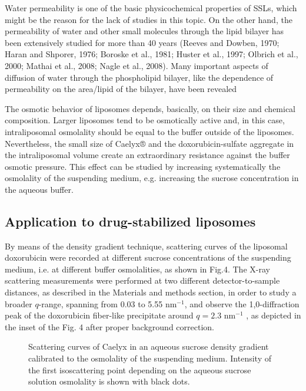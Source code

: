 Water permeability is one of the basic physicochemical properties of SSLs, which might be the reason for the lack of studies in this topic. On the other hand, the permeability of water and other small molecules through the lipid bilayer has been extensively studied for more than 40 years (Reeves and Dowben, 1970; Haran and Shporer, 1976; Boroske et al., 1981; Huster et al., 1997; Olbrich et al., 2000; Mathai et al., 2008; Nagle et al., 2008). Many important aspects of diffusion of water through the phospholipid bilayer, like the dependence of permeability on the area/lipid of the bilayer, have been revealed


The osmotic behavior of liposomes depends, basically, on their size and chemical composition. Larger liposomes tend to be osmotically active \cite{de_gier_osmotic_1993} and, in this case, intraliposomal osmolality should be equal to the buffer outside of the liposomes. Nevertheless, the small size of Caelyx® and the doxorubicin-sulfate aggregate in the intraliposomal volume create an extraordinary resistance against the buffer osmotic pressure. This effect can be studied by increasing systematically the osmolality of the suspending medium, e.g. increasing the sucrose concentration in the aqueous buffer.

\subsection{Application to drug-stabilized liposomes}
\label{sec:OsmoticCaelyx}

By means of the density gradient technique, scattering curves of the liposomal doxorubicin were recorded at different sucrose concentrations of the suspending medium, i.e. at different buffer osmolalities, as shown in Fig.4. The X-ray scattering measurements were performed at two different detector-to-sample distances, as described in the Materials and methods section, in order to study a broader $q$-range, spanning from 0.03 to 5.55 nm$^{-1}$, and observe the 1,0-diffraction peak of the doxorubicin fiber-like precipitate around $q=2.3$ nm$^{-1}$ \cite{li_doxorubicin_1998}, as depicted in the inset of the Fig. 4 after proper background correction.

\begin{figure}
	\centering
		\caption{Scattering curves of Caelyx in an aqueous sucrose density gradient calibrated to the osmolality of the suspending medium. Intensity of the first isoscattering point depending on the aqueous sucrose solution osmolality is shown with black dots.}
\end{figure}

